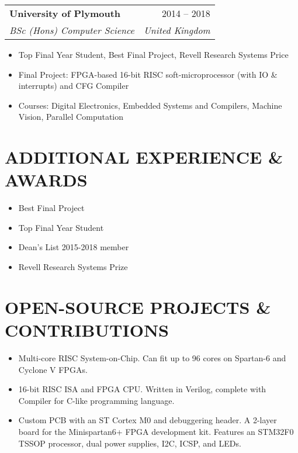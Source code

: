 \documentclass[letterpaper,11pt]{article}
\makeatletter
\newcommand{\resumeItem}[1]{
  \item\small{
    {#1 \vspace{-5pt}}
  }
}
\newcommand{\resumeSubheading}[4]{
  \vspace{-1pt}
    \begin{tabular*}{\textwidth}{l@{\extracolsep{\fill}}r}
      \textbf{#1} & #2 \\
      \textit{#3} & \textit{#4} \\
    \end{tabular*}\vspace{-3pt}
}
\newcommand{\resumeItemListStart}{\begin{itemize}}
\newcommand{\resumeItemListEnd}{\end{itemize}\vspace{-5pt}}
\makeatother
\begin{document}
     \vspace{10pt}
     \resumeSubheading{University of Plymouth}{2014 -- 2018}{BSc (Hons) Computer Science}{United Kingdom}
    \resumeItemListStart
        \resumeItem{Top Final Year Student, Best Final Project, Revell Research Systems Price}
        \resumeItem{Final Project: FPGA-based 16-bit RISC soft-microprocessor (with IO \& interrupts) and CFG Compiler}
        \resumeItem{Courses: Digital Electronics, Embedded Systems and Compilers, Machine Vision, Parallel Computation}
    \resumeItemListEnd

\vspace{10pt}
\section{ADDITIONAL EXPERIENCE \& AWARDS}
    \vspace{-15pt}
\begin{multicols}{2}
    \resumeItemListStart
    \resumeItem{Best Final Project}
    \resumeItem{Top Final Year Student}
    \resumeItemListEnd
\columnbreak
    \resumeItemListStart
    \resumeItem{Dean’s List 2015-2018 member}
    \resumeItem{Revell Research Systems Prize}
    \resumeItemListEnd
\end{multicols}\vspace{5pt}

\section{OPEN-SOURCE PROJECTS \& CONTRIBUTIONS}
    \resumeItemListStart
    \resumeItem{Multi-core RISC System-on-Chip. Can fit up to 96 cores on Spartan-6 and Cyclone V FPGAs.}
    \resumeItem{16-bit RISC ISA and FPGA CPU. Written in Verilog, complete with Compiler for C-like programming language.}
    \resumeItem{Custom PCB with an ST Cortex M0 and debuggering header. A 2-layer board for the Minispartan6+ FPGA development kit. Features an STM32F0 TSSOP processor, dual power supplies, I2C, ICSP, and LEDs.}
\resumeItemListEnd

\end{document}
